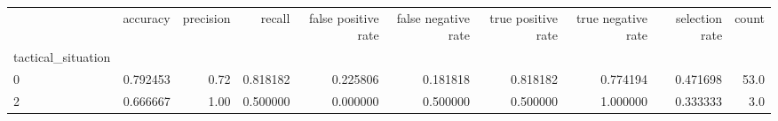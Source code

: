 \begin{tabular}{lrrrrrrrrr}
\toprule
{} &  accuracy &  precision &    recall &  false positive rate &  false negative rate &  true positive rate &  true negative rate &  selection rate &  count \\
tactical\_situation &           &            &           &                      &                      &                     &                     &                 &        \\
\midrule
0                  &  0.792453 &       0.72 &  0.818182 &             0.225806 &             0.181818 &            0.818182 &            0.774194 &        0.471698 &   53.0 \\
2                  &  0.666667 &       1.00 &  0.500000 &             0.000000 &             0.500000 &            0.500000 &            1.000000 &        0.333333 &    3.0 \\
\bottomrule
\end{tabular}
